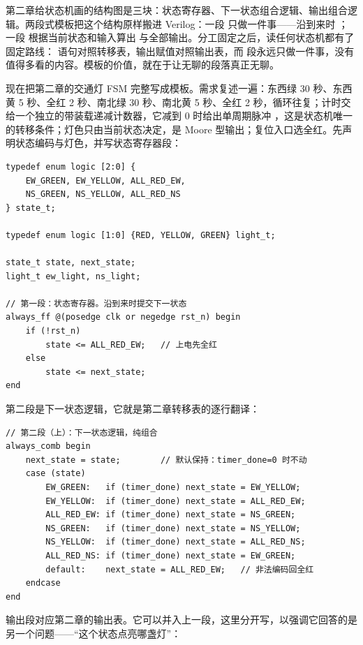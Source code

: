 
第二章给状态机画的结构图是三块：状态寄存器、下一状态组合逻辑、输出组合逻辑。两段式模板把这个结构原样搬进 Verilog：一段  只做一件事——沿到来时 ；一段  根据当前状态和输入算出  与全部输出。分工固定之后，读任何状态机都有了固定路线： 语句对照转移表，输出赋值对照输出表，而  段永远只做一件事，没有值得多看的内容。模板的价值，就在于让无聊的段落真正无聊。

现在把第二章的交通灯 FSM 完整写成模板。需求复述一遍：东西绿 30 秒、东西黄 5 秒、全红 2 秒、南北绿 30 秒、南北黄 5 秒、全红 2 秒，循环往复；计时交给一个独立的带装载递减计数器，它减到 0 时给出单周期脉冲 ，这是状态机唯一的转移条件；灯色只由当前状态决定，是 Moore 型输出；复位入口选全红。先声明状态编码与灯色，并写状态寄存器段：

\begin{lstlisting}
typedef enum logic [2:0] {
    EW_GREEN, EW_YELLOW, ALL_RED_EW,
    NS_GREEN, NS_YELLOW, ALL_RED_NS
} state_t;

typedef enum logic [1:0] {RED, YELLOW, GREEN} light_t;

state_t state, next_state;
light_t ew_light, ns_light;

// 第一段：状态寄存器。沿到来时提交下一状态
always_ff @(posedge clk or negedge rst_n) begin
    if (!rst_n)
        state <= ALL_RED_EW;   // 上电先全红
    else
        state <= next_state;
end
\end{lstlisting}

第二段是下一状态逻辑，它就是第二章转移表的逐行翻译：

\begin{lstlisting}
// 第二段（上）：下一状态逻辑，纯组合
always_comb begin
    next_state = state;        // 默认保持：timer_done=0 时不动
    case (state)
        EW_GREEN:   if (timer_done) next_state = EW_YELLOW;
        EW_YELLOW:  if (timer_done) next_state = ALL_RED_EW;
        ALL_RED_EW: if (timer_done) next_state = NS_GREEN;
        NS_GREEN:   if (timer_done) next_state = NS_YELLOW;
        NS_YELLOW:  if (timer_done) next_state = ALL_RED_NS;
        ALL_RED_NS: if (timer_done) next_state = EW_GREEN;
        default:    next_state = ALL_RED_EW;   // 非法编码回全红
    endcase
end
\end{lstlisting}

输出段对应第二章的输出表。它可以并入上一段，这里分开写，以强调它回答的是另一个问题——“这个状态点亮哪盏灯”：

